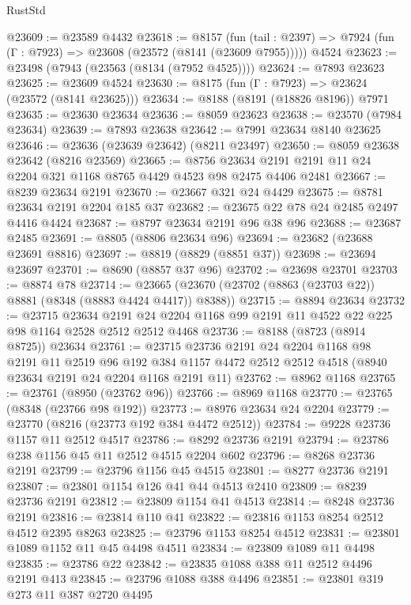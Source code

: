 \begin{lexlean}{RustStd}
\begin{coremodule}
@23609 := @23589 @4432
@23618 := @8157
    (fun (tail : @2397) => @7924 (fun (Γ : @7923) => @23608 (@23572 (@8141 (@23609 @7955)))))
    @4524
@23623 := @23498 (@7943 (@23563 (@8134 (@7952 @4525))))
@23624 := @7893 @23623
@23625 := @23609 @4524
@23630 := @8175 (fun (Γ : @7923) => @23624 (@23572 (@8141 @23625)))
@23634 := @8188 (@8191 (@18826 @8196)) @7971
@23635 := @23630 @23634
@23636 := @8059 @23623
@23638 := @23570 (@7984 @23634)
@23639 := @7893 @23638
@23642 := @7991 @23634 @8140 @23625
@23646 := @23636 (@23639 @23642) (@8211 @23497)
@23650 := @8059 @23638 @23642 (@8216 @23569)
@23665 := @8756 @23634 @2191 @2191 @11 @24 @2204 @321 @1168 @8765 @4429 @4523 @98 @2475 @4406 @2481
@23667 := @8239 @23634 @2191
@23670 := @23667 @321 @24 @4429
@23675 := @8781 @23634 @2191 @2204 @185 @37
@23682 := @23675 @22 @78 @24 @2485 @2497 @4416 @4424
@23687 := @8797 @23634 @2191 @96 @38 @96
@23688 := @23687 @2485
@23691 := @8805 (@8806 @23634 @96)
@23694 := @23682 (@23688 @23691 @8816)
@23697 := @8819 (@8829 (@8851 @37))
@23698 := @23694 @23697
@23701 := @8690 (@8857 @37 @96)
@23702 := @23698 @23701
@23703 := @8874 @78
@23714 := @23665 (@23670 (@23702 (@8863 (@23703 @22)) @8881 (@8348 (@8883 @4424 @4417)) @8388))
@23715 := @8894 @23634
@23732 := @23715
    @23634
    @2191
    @24
    @2204
    @1168
    @99
    @2191
    @11
    @4522
    @22
    @225
    @98
    @1164
    @2528
    @2512
    @2512
    @4468
@23736 := @8188 (@8723 (@8914 @8725)) @23634
@23761 := @23715
    @23736
    @2191
    @24
    @2204
    @1168
    @98
    @2191
    @11
    @2519
    @96
    @192
    @384
    @1157
    @4472
    @2512
    @2512
    @4518
    (@8940 @23634 @2191 @24 @2204 @1168 @2191 @11)
@23762 := @8962 @1168
@23765 := @23761 (@8950 (@23762 @96))
@23766 := @8969 @1168
@23770 := @23765 (@8348 (@23766 @98 @192))
@23773 := @8976 @23634 @24 @2204
@23779 := @23770 (@8216 (@23773 @192 @384 @4472 @2512))
@23784 := @9228 @23736 @1157 @11 @2512 @4517
@23786 := @8292 @23736 @2191
@23794 := @23786 @238 @1156 @45 @11 @2512 @4515 @2204 @602
@23796 := @8268 @23736 @2191
@23799 := @23796 @1156 @45 @4515
@23801 := @8277 @23736 @2191
@23807 := @23801 @1154 @126 @41 @44 @4513 @2410
@23809 := @8239 @23736 @2191
@23812 := @23809 @1154 @41 @4513
@23814 := @8248 @23736 @2191
@23816 := @23814 @110 @41
@23822 := @23816 @1153 @8254 @2512 @4512 @2395 @8263
@23825 := @23796 @1153 @8254 @4512
@23831 := @23801 @1089 @1152 @11 @45 @4498 @4511
@23834 := @23809 @1089 @11 @4498
@23835 := @23786 @22
@23842 := @23835 @1088 @388 @11 @2512 @4496 @2191 @413
@23845 := @23796 @1088 @388 @4496
@23851 := @23801 @319 @273 @11 @387 @2720 @4495

\end{coremodule}
\end{lexlean}
